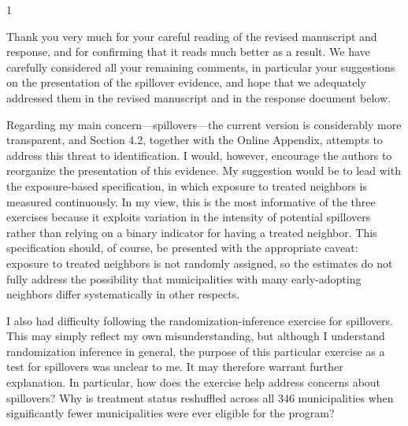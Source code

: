 
\begin{spacing}{1}
\justifying \color{darkdarkgray} \noindent

Thank you very much for your careful reading of the revised manuscript and response, and for confirming that it reads much better as a result. We have carefully considered all your remaining comments, in particular your suggestions on the presentation of the spillover evidence, and hope that we adequately addressed them in the revised manuscript and in the response document below.

\end{spacing}


\begin{bibunit}


\begin{refcomment}

Regarding my main concern---spillovers---the current version is considerably more transparent, and Section 4.2, together with the Online Appendix, attempts to address this threat to identification. I would, however, encourage the authors to reorganize the presentation of this evidence. My suggestion would be to lead with the exposure-based specification, in which exposure to treated neighbors is measured continuously. In my view, this is the most informative of the three exercises because it exploits variation in the intensity of potential spillovers rather than relying on a binary indicator for having a treated neighbor. This specification should, of course, be presented with the appropriate caveat: exposure to treated neighbors is not randomly assigned, so the estimates do not fully address the possibility that municipalities with many early-adopting neighbors differ systematically in other respects.
\label{pt:r2_01}

\end{refcomment}


\begin{response}
    
\end{response}




\begin{refcomment}

I also had difficulty following the randomization-inference exercise for spillovers. This may simply reflect my own misunderstanding, but although I understand randomization inference in general, the purpose of this particular exercise as a test for spillovers was unclear to me. It may therefore warrant further explanation. In particular, how does the exercise help address concerns about spillovers? Why is treatment status reshuffled across all 346 municipalities when significantly fewer municipalities were ever eligible for the program?


\end{refcomment}
\end{bibunit}
